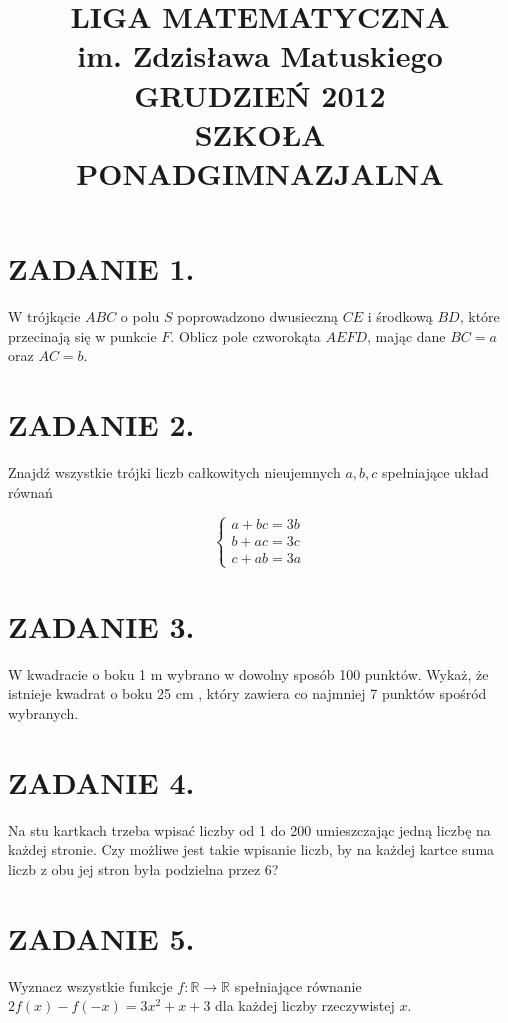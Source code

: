\documentclass[10pt]{article}
\title{LIGA MATEMATYCZNA \\
 im. Zdzisława Matuskiego \\
 GRUDZIEŃ 2012 \\
 SZKOŁA PONADGIMNAZJALNA }
\author{}
\date{}
\begin{document}
\maketitle
\section*{ZADANIE 1.}
W trójkącie \(A B C\) o polu \(S\) poprowadzono dwusieczną \(C E\) i środkową \(B D\), które przecinają się w punkcie \(F\). Oblicz pole czworokąta \(A E F D\), mając dane \(B C=a\) oraz \(A C=b\).

\section*{ZADANIE 2.}
Znajdź wszystkie trójki liczb całkowitych nieujemnych \(a, b, c\) spełniające układ równań

\[
\left\{\begin{array}{l}
a+b c=3 b \\
b+a c=3 c \\
c+a b=3 a
\end{array}\right.
\]

\section*{ZADANIE 3.}
W kwadracie o boku 1 m wybrano w dowolny sposób 100 punktów. Wykaż, że istnieje kwadrat o boku 25 cm , który zawiera co najmniej 7 punktów spośród wybranych.

\section*{ZADANIE 4.}
Na stu kartkach trzeba wpisać liczby od 1 do 200 umieszczając jedną liczbę na każdej stronie. Czy możliwe jest takie wpisanie liczb, by na każdej kartce suma liczb z obu jej stron była podzielna przez 6?

\section*{ZADANIE 5.}
Wyznacz wszystkie funkcje \(f: \mathbb{R} \rightarrow \mathbb{R}\) spełniające równanie \(2 f(x)-f(-x)=3 x^{2}+x+3\) dla każdej liczby rzeczywistej \(x\).
\end{document}
